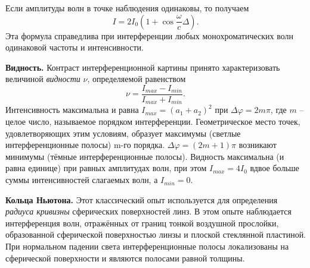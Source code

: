 \documentclass[a4paper,12pt]{article}
\begin{document}
Если амплитуды волн в точке наблюдения одинаковы, то получаем 
\begin{equation}\label{eq: Интенсивность через оптическую разность хода}
    I = 2I_0 (1 + \cos{\frac{\omega}{c} \Delta}).
\end{equation}
Эта формула справедлива при интерференции любых монохроматических волн одинаковой частоты и интенсивности.

\textbf{Видность.}
Контраст интерференционной картины принято характеризовать величиной \textit{видности} $\nu$, определяемой равенством
\begin{equation}\label{eq: Видность}
    \nu = \frac{I_{max} - I_{min}}{I_{max} + I_{min}}.
\end{equation}
Интенсивность максимальна и равна $I_{max} = (a_1 + a_2)^2$ при $\Delta\varphi = 2m \pi$, где $m$ -- целое число, называемое порядком интерференции. Геометрическое место точек, удовлетворяющих этим условиям, образует максимумы (светлые интерференционные полосы) m-го порядка. $\Delta\varphi = (2m + 1) \pi$ возникают минимумы (тёмные интерференционные полосы). Видность максимальна (и равна единице) при равных амплитудах волн, при этом $I_{max} = 4 I_0$ вдвое больше суммы интенсивностей
слагаемых волн, а $I_{min} = 0$.

\textbf{Кольца Ньютона.} 
Этот классический опыт используется для определения \textit{радиуса кривизны} сферических поверхностей линз. В этом опыте наблюдается интерференция волн, отражённых от границ тонкой воздушной прослойки, образованной сферической поверхностью линзы и плоской стеклянной пластиной. При нормальном падении света интерференционные полосы локализованы на сферической поверхности и являются полосами равной толщины.
\end{document}
